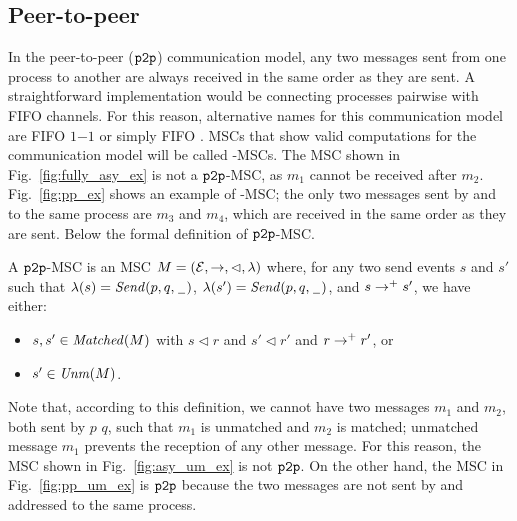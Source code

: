 \subsection{ Peer-to-peer}
In the peer-to-peer ($\mathtt{p2p}$) communication model, any two messages sent from one process to another  are always received in the same order as they are sent. A straightforward implementation would be connecting processes pairwise with FIFO channels. %
For this reason, alternative names for this communication model are FIFO $1\mathsf{-}1$ \cite{DBLP:journals/fac/ChevrouHQ16} or simply FIFO \cite{babaoglu1993consistent, DBLP:journals/dc/Charron-BostMT96, tel2000introduction}.
MSCs that show valid computations for the \pp communication model will be called \pp-MSCs.
The MSC shown in Fig.~\ref{fig:fully_asy_ex} is not a $\mathtt{p2p}$-MSC, as $m_1$ cannot be received after $m_2$.
Fig.~\ref{fig:pp_ex} shows an example of \pp-MSC; the only two messages sent by and to the same process are $m_3$ and $m_4$, which are received in the same order as they are sent. Below the formal definition of $\mathtt{p2p}$-MSC.

\begin{definition}\label{def:pp_msc}
	A $\mathtt{p2p}$-MSC is an MSC $M = (\mathcal{E},\to,\lhd,\lambda)$ where, for any two send events $s$ and $s'$ such that $\lambda(s)={\mathit{Send}(p,q,\hspace{0.1em}\underline{\hspace{0.5em}}\hspace{0.1em})}$, $\lambda(s')={\mathit{Send}(p,q,\hspace{0.1em}\underline{\hspace{0.5em}}\hspace{0.1em})}$, and $s \to^+ s'$, we have either:
	\begin{itemize}%
		\item $s,s' \in \mathit{Matched}(M)$ with $s \lhd r$ and $s' \lhd r'$ and $r \to^+ r'$, or %
		\item $s' \in \mathit{Unm}(M)$.
	\end{itemize}
	
\end{definition}

Note that, according to this definition, we cannot have two messages $m_1$ and $m_2$, both sent by  $p$  $q$, such that $m_1$ is unmatched and $m_2$ is matched;  unmatched message $m_1$ prevents the reception of any other message. For this reason, the MSC shown in Fig.~\ref{fig:asy_um_ex} is not $\mathtt{p2p}$. On the other hand, the MSC in Fig.~\ref{fig:pp_um_ex} is $\mathtt{p2p}$ because the two messages are not sent by and addressed to the same process.

